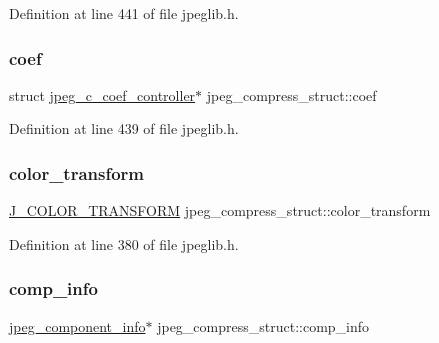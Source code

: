 Definition at line 441 of file jpeglib.\+h.

\mbox{\label{structjpeg__compress__struct_ad54865b66c30ce332c6757d56393dedc}} 
\subsubsection{\texorpdfstring{coef}{coef}}
{\footnotesize\ttfamily struct \mbox{\hyperlink{structjpeg__c__coef__controller}{jpeg\+\_\+c\+\_\+coef\+\_\+controller}}$\ast$ jpeg\+\_\+compress\+\_\+struct\+::coef}



Definition at line 439 of file jpeglib.\+h.

\mbox{\label{structjpeg__compress__struct_a3533c65068c4cec8f048019d2b1c0557}} 
\subsubsection{\texorpdfstring{color\_transform}{color\_transform}}
{\footnotesize\ttfamily \mbox{\hyperlink{jpeglib_8h_a26af503ae521188ce89abc2c7adee7f0}{J\+\_\+\+C\+O\+L\+O\+R\+\_\+\+T\+R\+A\+N\+S\+F\+O\+RM}} jpeg\+\_\+compress\+\_\+struct\+::color\+\_\+transform}



Definition at line 380 of file jpeglib.\+h.

\mbox{\label{structjpeg__compress__struct_a4d37d3f336cc11acafef541bf8ed38cc}} 
\subsubsection{\texorpdfstring{comp\_info}{comp\_info}}
{\footnotesize\ttfamily \mbox{\hyperlink{structjpeg__component__info}{jpeg\+\_\+component\+\_\+info}}$\ast$ jpeg\+\_\+compress\+\_\+struct\+::comp\+\_\+info}



